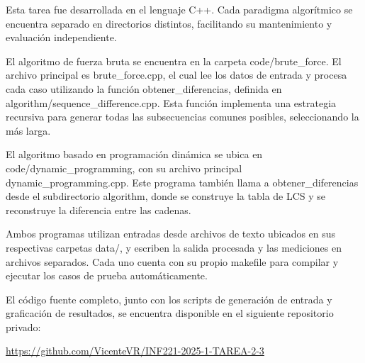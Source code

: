 Esta tarea fue desarrollada en el lenguaje C++. Cada paradigma algorítmico se encuentra separado en directorios distintos, facilitando su mantenimiento y evaluación independiente.

El algoritmo de fuerza bruta se encuentra en la carpeta code/brute\_force. El archivo principal es brute\_force.cpp, el cual lee los datos de entrada y procesa cada caso utilizando la función obtener\_diferencias, definida en algorithm/sequence\_difference.cpp. Esta función implementa una estrategia recursiva para generar todas las subsecuencias comunes posibles, seleccionando la más larga.

El algoritmo basado en programación dinámica se ubica en code/dynamic\_programming, con su archivo principal dynamic\_programming.cpp. Este programa también llama a obtener\_diferencias desde el subdirectorio algorithm, donde se construye la tabla de LCS y se reconstruye la diferencia entre las cadenas.

Ambos programas utilizan entradas desde archivos de texto ubicados en sus respectivas carpetas data/, y escriben la salida procesada y las mediciones en archivos separados. Cada uno cuenta con su propio makefile para compilar y ejecutar los casos de prueba automáticamente.

El código fuente completo, junto con los scripts de generación de entrada y graficación de resultados, se encuentra disponible en el siguiente repositorio privado:

\begin{mdframed}
    \begin{center}
        {\Large \url{https://github.com/VicenteVR/INF221-2025-1-TAREA-2-3}}
    \end{center}
\end{mdframed}
